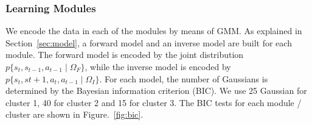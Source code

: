 
\subsubsection{Learning Modules}
\label{sec:module}
We encode the data in each of the modules by means of GMM. As
explained in Section~\ref{sec:model}, a forward model and an inverse
model are built for each module. The forward model is encoded by the
joint distribution $p\{s_t,s_{t-1},a_{t-1}\mid\Omega_F\}$, while the
inverse model is encoded by
$p\{s_t,s{t+1},a_t,a_{t-1}\mid\Omega_I\}$. For each model, the number
of Gaussians is determined by the Bayesian information criterion
(BIC). We use 25 Gaussian for cluster 1, 40 for cluster 2 and 15 for
cluster 3. The BIC tests for each module / cluster are shown in
Figure.~\ref{fig:bic}.


